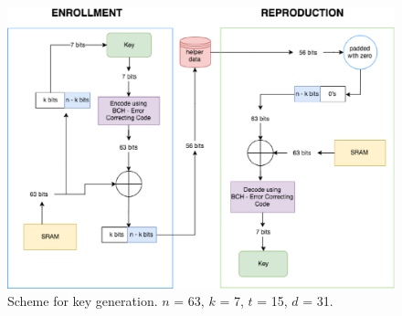 \begin{figure}[tph!]
    \centerline{\includegraphics[width={\textwidth}]{images/key}}
    \caption{Scheme for key generation. $n$ = 63, $k$ = 7, $t$ = 15, $d$ = 31.}
    \label{fig:key-generation-scheme}
\end{figure}


